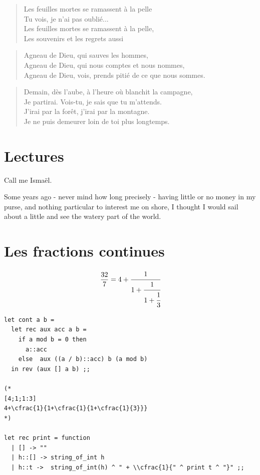 \begin{verse}
	Les feuilles mortes se ramassent à la pelle \\
	Tu vois, je n'ai pas oublié... \\
	Les feuilles mortes se ramassent à la pelle, \\
	Les souvenirs et les regrets aussi \\
\end{verse}

\begin{verse}
	Agneau de Dieu, qui sauves les hommes, \\
	Agneau de Dieu, qui nous comptes et nous nommes, \\
	Agneau de Dieu, vois, prends pitié de ce que nous sommes. \\
\end{verse}


\begin{verse}
	Demain, dès l'aube, à l'heure où blanchit la campagne, \\
	Je partirai. Vois-tu, je sais que tu m'attends. \\
	J'irai par la forêt, j'irai par la montagne. \\
	Je ne puis demeurer loin de toi plus longtemps. \\
\end{verse}


\section{Lectures}
Call me Ismaël. \cite{moby}

Some years ago - never mind how long precisely - having little or no money in my purse, 
and nothing particular to interest me on shore,
I thought I would sail about a little and see the watery part of the world. 
\section{Les fractions continues}

$$
\frac{32}{7} = 4+\cfrac{1}{1+\cfrac{1}{1+\cfrac{1}{3}}}
$$


\begin{verbatim}
let cont a b =
  let rec aux acc a b =
    if a mod b = 0 then
      a::acc
    else  aux ((a / b)::acc) b (a mod b)
  in rev (aux [] a b) ;;

(* 
[4;1;1:3]
4+\cfrac{1}{1+\cfrac{1}{1+\cfrac{1}{3}}}
*)

let rec print = function
  | [] -> ""
  | h::[] -> string_of_int h 
  | h::t ->  string_of_int(h) ^ " + \\cfrac{1}{" ^ print t ^ "}" ;;
\end{verbatim}

